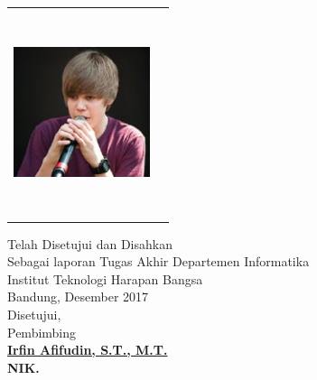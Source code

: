 \begin{center}   
\begin{tabular}{ p{4.5cm}  p{5.5cm}}
 \includegraphics[width=4cm, height =6cm]{images/bieber.jpg} &
\vspace{-4cm}{Disusun oleh:\newline Nama: Edric Laksa Putra\newline NIM	: 1114065}

\end{tabular}
\end{center}
\doublespacing
{\center
\vspace{1cm}
Telah Disetujui dan Disahkan\\ Sebagai laporan Tugas Akhir Departemen Informatika\\
Institut Teknologi Harapan Bangsa\\[0.5cm]
Bandung,   Desember 2017\\
Disetujui,\\[0.5cm]
Pembimbing\\[2cm]
\bfseries 
{\underline {Irfin Afifudin, S.T., M.T.}\\
NIK. \\}}